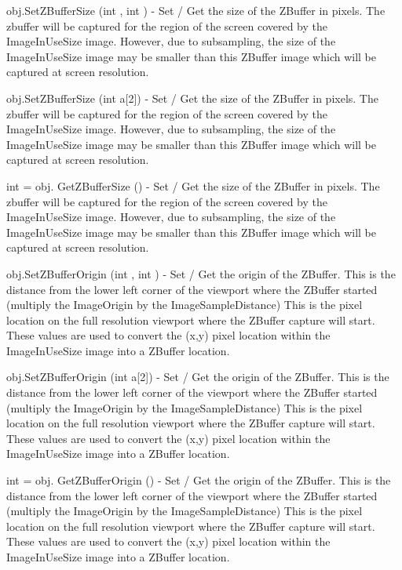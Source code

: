 \begin{DoxyItemize}
\item {\ttfamily obj.\-Set\-Z\-Buffer\-Size (int , int )} -\/ Set / Get the size of the Z\-Buffer in pixels. The zbuffer will be captured for the region of the screen covered by the Image\-In\-Use\-Size image. However, due to subsampling, the size of the Image\-In\-Use\-Size image may be smaller than this Z\-Buffer image which will be captured at screen resolution.  
\item {\ttfamily obj.\-Set\-Z\-Buffer\-Size (int a\mbox{[}2\mbox{]})} -\/ Set / Get the size of the Z\-Buffer in pixels. The zbuffer will be captured for the region of the screen covered by the Image\-In\-Use\-Size image. However, due to subsampling, the size of the Image\-In\-Use\-Size image may be smaller than this Z\-Buffer image which will be captured at screen resolution.  
\item {\ttfamily int = obj. Get\-Z\-Buffer\-Size ()} -\/ Set / Get the size of the Z\-Buffer in pixels. The zbuffer will be captured for the region of the screen covered by the Image\-In\-Use\-Size image. However, due to subsampling, the size of the Image\-In\-Use\-Size image may be smaller than this Z\-Buffer image which will be captured at screen resolution.  
\item {\ttfamily obj.\-Set\-Z\-Buffer\-Origin (int , int )} -\/ Set / Get the origin of the Z\-Buffer. This is the distance from the lower left corner of the viewport where the Z\-Buffer started (multiply the Image\-Origin by the Image\-Sample\-Distance) This is the pixel location on the full resolution viewport where the Z\-Buffer capture will start. These values are used to convert the (x,y) pixel location within the Image\-In\-Use\-Size image into a Z\-Buffer location.  
\item {\ttfamily obj.\-Set\-Z\-Buffer\-Origin (int a\mbox{[}2\mbox{]})} -\/ Set / Get the origin of the Z\-Buffer. This is the distance from the lower left corner of the viewport where the Z\-Buffer started (multiply the Image\-Origin by the Image\-Sample\-Distance) This is the pixel location on the full resolution viewport where the Z\-Buffer capture will start. These values are used to convert the (x,y) pixel location within the Image\-In\-Use\-Size image into a Z\-Buffer location.  
\item {\ttfamily int = obj. Get\-Z\-Buffer\-Origin ()} -\/ Set / Get the origin of the Z\-Buffer. This is the distance from the lower left corner of the viewport where the Z\-Buffer started (multiply the Image\-Origin by the Image\-Sample\-Distance) This is the pixel location on the full resolution viewport where the Z\-Buffer capture will start. These values are used to convert the (x,y) pixel location within the Image\-In\-Use\-Size image into a Z\-Buffer location.  

\end{DoxyItemize}
